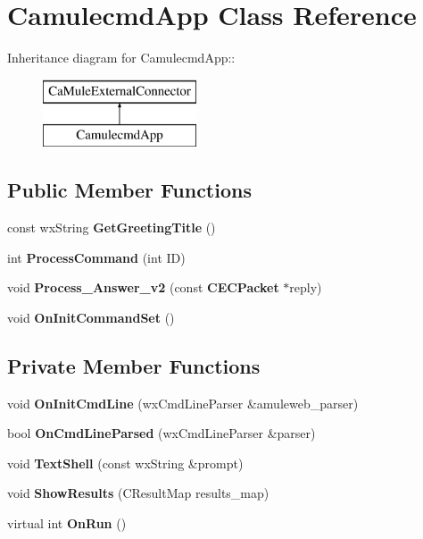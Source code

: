 \section{CamulecmdApp Class Reference}
\label{classCamulecmdApp}
Inheritance diagram for CamulecmdApp::\begin{figure}[H]
\begin{center}
\leavevmode
\includegraphics[height=2cm]{classCamulecmdApp}
\end{center}
\end{figure}
\subsection*{Public Member Functions}
\begin{DoxyCompactItemize}
\item 
const wxString {\bfseries GetGreetingTitle} ()\label{classCamulecmdApp_a58d4a50fd7b4d169b34b8d563e042e43}

\item 
int {\bfseries ProcessCommand} (int ID)\label{classCamulecmdApp_a37b60b684c7803d7ea5459b10cd3a24a}

\item 
void {\bfseries Process\_\-Answer\_\-v2} (const {\bf CECPacket} $\ast$reply)\label{classCamulecmdApp_a3a5ee95fc21e769fefa37aa04627dbaf}

\item 
void {\bfseries OnInitCommandSet} ()\label{classCamulecmdApp_aceb10818b76fbaf322be0fb40b67115c}

\end{DoxyCompactItemize}
\subsection*{Private Member Functions}
\begin{DoxyCompactItemize}
\item 
void {\bfseries OnInitCmdLine} (wxCmdLineParser \&amuleweb\_\-parser)\label{classCamulecmdApp_acb80d7b567394067611679a205b6b950}

\item 
bool {\bfseries OnCmdLineParsed} (wxCmdLineParser \&parser)\label{classCamulecmdApp_ab16ae2d6f5947f784e5b759807e79657}

\item 
void {\bfseries TextShell} (const wxString \&prompt)\label{classCamulecmdApp_a50be5d44e28025509d5aa5144e959f67}

\item 
void {\bfseries ShowResults} (CResultMap results\_\-map)\label{classCamulecmdApp_a33036a9cf9384240261f1afb677e55be}

\item 
virtual int {\bfseries OnRun} ()\label{classCamulecmdApp_a7b0e96c53efe689af3abdb1bac99bdbc}

\end{DoxyCompactItemize}
